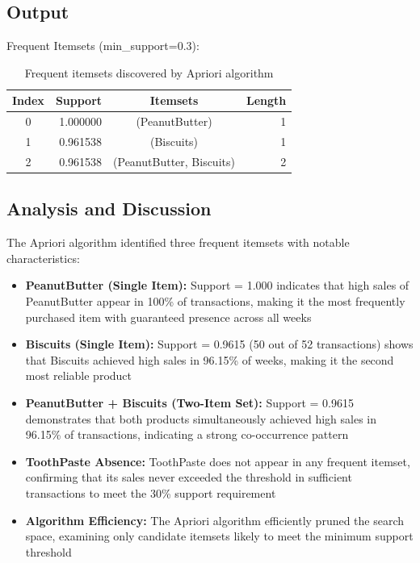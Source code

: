 \documentclass[12pt,a4paper]{article}
\begin{document}
\subsection{Output}
Frequent Itemsets (min\_support=0.3):
\begin{table}[H]
\centering
\small
\begin{tabular}{c|r|c|r}
\toprule
\textbf{Index} & \textbf{Support} & \textbf{Itemsets} & \textbf{Length} \\
\midrule
0 & 1.000000 & (PeanutButter) & 1 \\
1 & 0.961538 & (Biscuits) & 1 \\
2 & 0.961538 & (PeanutButter, Biscuits) & 2 \\
\bottomrule
\end{tabular}
\caption{Frequent itemsets discovered by Apriori algorithm}
\end{table}

\subsection{Analysis and Discussion}
The Apriori algorithm identified three frequent itemsets with notable characteristics:

\begin{itemize}
    \item \textbf{PeanutButter (Single Item):} Support = 1.000 indicates that high sales of PeanutButter appear in 100\% of transactions, making it the most frequently purchased item with guaranteed presence across all weeks
    
    \item \textbf{Biscuits (Single Item):} Support = 0.9615 (50 out of 52 transactions) shows that Biscuits achieved high sales in 96.15\% of weeks, making it the second most reliable product
    
    \item \textbf{PeanutButter + Biscuits (Two-Item Set):} Support = 0.9615 demonstrates that both products simultaneously achieved high sales in 96.15\% of transactions, indicating a strong co-occurrence pattern
    
    \item \textbf{ToothPaste Absence:} ToothPaste does not appear in any frequent itemset, confirming that its sales never exceeded the threshold in sufficient transactions to meet the 30\% support requirement
    
    \item \textbf{Algorithm Efficiency:} The Apriori algorithm efficiently pruned the search space, examining only candidate itemsets likely to meet the minimum support threshold
\end{itemize}
\end{document}
